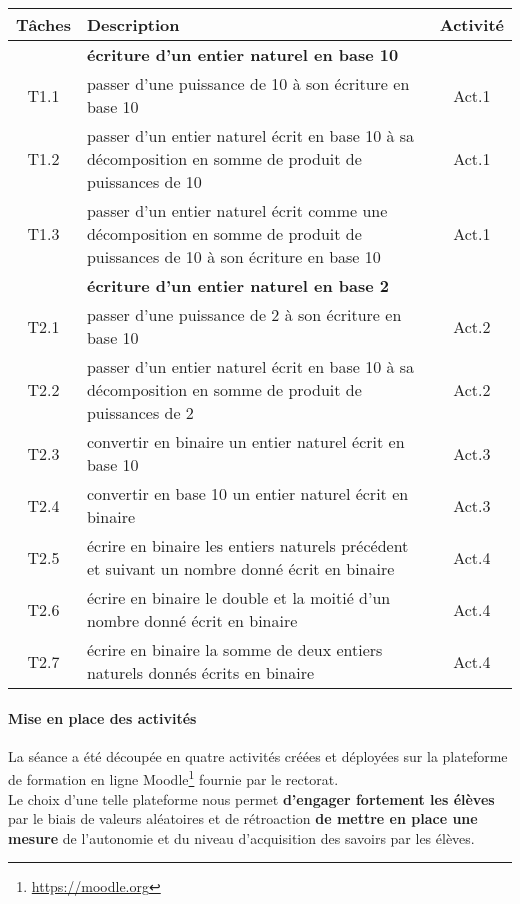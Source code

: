 \begin{tabularx}{\linewidth}{|cXc|} \hline
    \bfseries Tâches & \centering \bfseries Description & \bfseries Activité \\ \hline
    & \centering \bfseries écriture d'un entier naturel en base 10 & \\
    T1.1 & passer d'une puissance de 10 à son écriture en base 10  & Act.1 \\
    T1.2 & passer d'un entier naturel écrit en base 10 à sa décomposition en somme de produit de puissances de 10  & Act.1 \\
    T1.3 & passer d'un entier naturel écrit comme une décomposition en somme de produit de puissances de 10 à son écriture en base 10 & Act.1 \\ 
    \hline
    \hline

    & \centering \bfseries écriture d'un entier naturel en base 2 & \\
    T2.1 & passer d'une puissance de 2 à son écriture en base 10 & Act.2
    \\
    T2.2 & passer d'un entier naturel écrit en base 10 à sa décomposition en somme de produit de puissances de 2 & Act.2\\ 
    \hdashline

    T2.3 & convertir en binaire un entier naturel écrit en base 10 & Act.3\\
    T2.4& convertir en base 10 un entier naturel écrit en binaire & Act.3\\
    \hdashline

    T2.5 & écrire en binaire les entiers naturels précédent et suivant un nombre donné écrit en binaire & Act.4 \\
    T2.6 & écrire en binaire le double et la moitié d'un nombre donné écrit en binaire & Act.4 \\
    T2.7 & écrire en binaire la somme de deux entiers naturels donnés écrits en binaire & Act.4\\
    \hline
\end{tabularx}


\paragraph{Mise en place des activités}
%
La séance a été découpée en quatre activités créées et déployées sur la plateforme de formation en ligne Moodle\footnote{\href{https://moodle.org}{https://moodle.org}} fournie par le rectorat.
\\
Le choix d'une telle plateforme nous permet \textbf{d'engager fortement les élèves} par le biais de valeurs aléatoires et de rétroaction \textbf{de mettre en place une mesure} de l'autonomie et du niveau d'acquisition des savoirs par les élèves.

